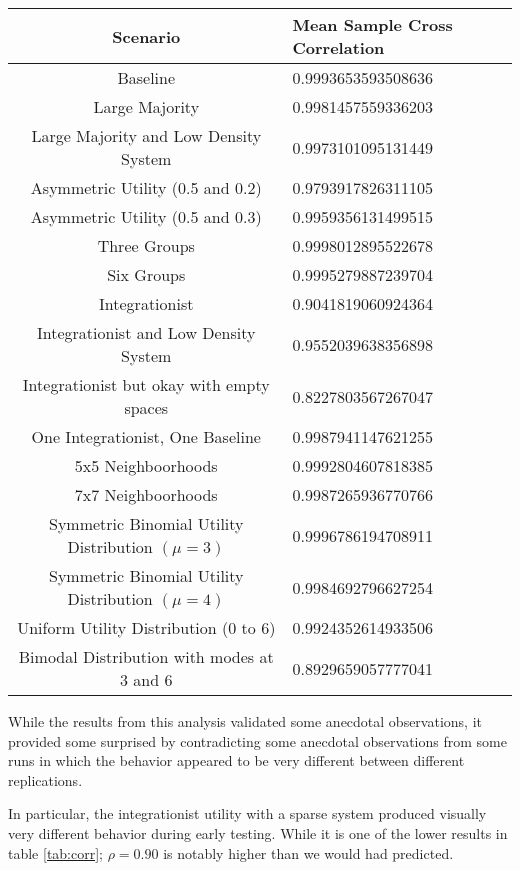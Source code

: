 \documentclass[sigplan,nonacm]{acmart}
\begin{document}
\begin{table*}
	\centering
	\caption{}
	\label{tab:corr}
	\begin{tabular}{c|l}
		\toprule
		Scenario & Mean Sample Cross Correlation \\
		\midrule
		Baseline &   0.9993653593508636  \\
		Large Majority &   0.9981457559336203  \\
		Large Majority and Low Density System &   0.9973101095131449  \\
		Asymmetric Utility (0.5 and 0.2) &   0.9793917826311105  \\
		Asymmetric Utility (0.5 and 0.3) &   0.9959356131499515  \\
		Three Groups &   0.9998012895522678  \\
		Six Groups &   0.9995279887239704  \\
		Integrationist &   0.9041819060924364  \\
		Integrationist and Low Density System &   0.9552039638356898  \\
		Integrationist but okay with empty spaces & 0.8227803567267047 \\
		One Integrationist, One Baseline  &   0.9987941147621255  \\
		5x5 Neighboorhoods &   0.9992804607818385  \\
		7x7 Neighboorhoods &   0.9987265936770766  \\
		Symmetric Binomial Utility Distribution \((\mu=3)\) &   0.9996786194708911  \\
		Symmetric Binomial Utility Distribution \((\mu=4)\) &   0.9984692796627254  \\
		Uniform Utility Distribution (0 to 6) &   0.9924352614933506  \\		
		Bimodal Distribution with modes at 3 and 6 &   0.8929659057777041  \\
		\bottomrule
	\end{tabular}
\end{table*}

While the results from this analysis validated some anecdotal observations,
it provided some surprised by contradicting some anecdotal observations from some
runs in which the behavior appeared to be very different between different replications.

In particular, the integrationist utility with a sparse system produced visually very different behavior during early testing. 
While it is one of the lower results in table \ref{tab:corr}; \(\rho=0.90\) is notably higher than we would had predicted.
\end{document}
